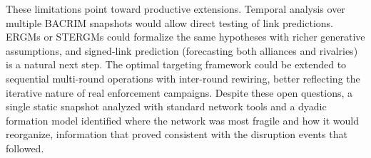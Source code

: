 \documentclass[11pt, a4paper]{article}
\begin{document}
These limitations point toward productive extensions. Temporal analysis over multiple BACRIM snapshots would allow direct testing of link predictions. ERGMs or STERGMs could formalize the same hypotheses with richer generative assumptions, and signed-link prediction (forecasting both alliances and rivalries) is a natural next step. The optimal targeting framework could be extended to sequential multi-round operations with inter-round rewiring, better reflecting the iterative nature of real enforcement campaigns. Despite these open questions, a single static snapshot analyzed with standard network tools and a dyadic formation model identified where the network was most fragile and how it would reorganize, information that proved consistent with the disruption events that followed.



\end{document}

